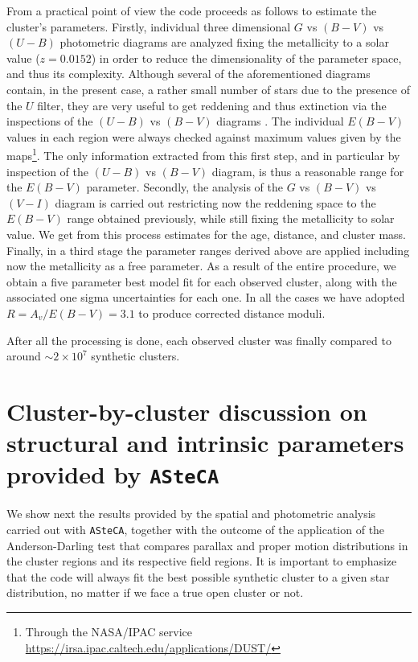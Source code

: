 \documentclass[draft]{aa}
\begin{document}
From a practical point of view the code proceeds as follows to estimate the
cluster's parameters. Firstly, individual three dimensional $G$ vs $(B-V)$ vs $
(U-B)$ photometric diagrams are analyzed fixing the metallicity to a solar
value ($z = 0.0152$) in order to reduce the dimensionality of the parameter
space, and thus its complexity. Although several of the aforementioned diagrams
contain, in the present case, a rather small number of stars due to the
presence of the $U$ filter, they are very useful to get reddening and thus
extinction via the inspections of the $(U-B)$ vs $(B-V)$ diagrams
\citep{Vazquez2008} .
The individual $E(B-V)$ values in each region were always checked against
maximum values given by the \cite{Schlafly_2011} maps\footnote{Through the
NASA/IPAC service \url{https://irsa.ipac.caltech.edu/applications/DUST/}}.
The only information extracted from this first step, and in particular
by inspection of the $(U-B)$ vs $(B-V)$ diagram, is thus a reasonable range for
the $E(B-V)$ parameter.
%
Secondly, the analysis of the $G$ vs $(B-V)$ vs $(V-I)$ diagram is carried out
restricting now the reddening space to the $E(B-V)$ range obtained previously,
while still fixing the metallicity to solar value. We get from this process
estimates for the age, distance, and cluster mass.
%
Finally, in a third stage the parameter ranges derived above are applied
including now the metallicity as a free parameter. As a result of the entire
procedure, we obtain a five parameter best model fit for each observed cluster,
along with the associated one sigma uncertainties for each one. In all the
cases we have adopted $R=A_v/E(B-V) = 3.1$ to produce corrected distance moduli.

After all the processing is done, each observed cluster was finally compared to
around $\sim2\times10^7$ synthetic clusters.



\section{Cluster-by-cluster discussion on structural and intrinsic parameters
provided by \texttt{ASteCA}}
\label{sec:cluster_discuss}

We show next the results provided by the spatial and photometric analysis
carried out with \texttt{ASteCA}, together with the outcome of the application
of the Anderson-Darling test that compares parallax and proper motion
distributions in the cluster regions and its respective field regions.
It is important to emphasize that the code will always fit the
best possible synthetic cluster to a given star distribution, no matter if we
face a true open cluster or not.
\end{document}
